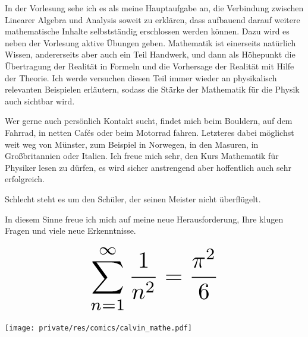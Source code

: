 \begin{multicols}{2}
In der Vorlesung sehe ich es als meine Hauptaufgabe an, die Verbindung zwischen Linearer Algebra und Analysis soweit zu erklären, dass aufbauend darauf weitere mathematische Inhalte selbstständig erschlossen werden können. Dazu wird es neben der Vorlesung aktive Übungen geben. Mathematik ist einerseits natürlich Wissen, andererseits aber auch ein Teil Handwerk, und dann als Höhepunkt die Übertragung der Realität in Formeln und die Vorhersage der Realität mit Hilfe der Theorie. Ich werde versuchen diesen Teil immer wieder an physikalisch relevanten Beispielen erläutern, sodass die Stärke der Mathematik für die Physik auch sichtbar wird.

Wer gerne auch persönlich Kontakt sucht, findet mich beim Bouldern, auf dem Fahrrad, in netten Cafés oder beim Motorrad fahren. Letzteres dabei möglichst weit weg von Münster, zum Beispiel in Norwegen, in den Masuren, in Großbritannien oder Italien. Ich freue mich sehr, den Kurs Mathematik für Physiker lesen zu dürfen, es wird sicher anstrengend aber hoffentlich auch sehr erfolgreich.

Schlecht steht es um den Schüler, der seinen Meister nicht überflügelt.

In diesem Sinne freue ich mich auf meine neue Herausforderung, Ihre klugen Fragen und viele neue Erkenntnisse.

\[
\resizebox{0.45\hsize}{!}{$\displaystyle\sum_{n = 1}^\infty \frac{1}{n^2} = \frac{\pi^2}{6}$}
\]

\begin{center}
 	\texttt{[image: private/res/comics/calvin\_mathe.pdf]}
\end{center}

\end{multicols}
